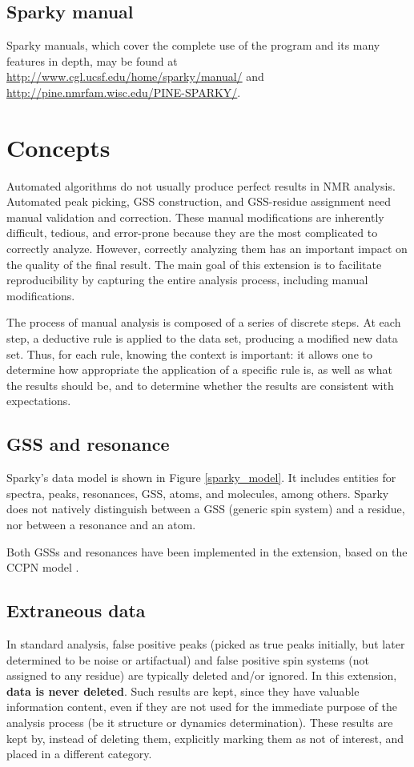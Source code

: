 \subsection*{Sparky manual}
Sparky manuals, which cover the complete use of the program and its many
features in depth, may be found at 
\url{http://www.cgl.ucsf.edu/home/sparky/manual/} and 
\url{http://pine.nmrfam.wisc.edu/PINE-SPARKY/}.


\section{Concepts}
Automated algorithms do not usually produce perfect results in NMR analysis.
Automated peak picking,
GSS construction, and GSS-residue assignment need manual validation and
correction.  These manual modifications are inherently difficult, tedious,
and error-prone because they are the most complicated to correctly analyze.
However, correctly analyzing them has an important impact on the quality
of the final result.
The main goal of this extension is to facilitate reproducibility
by capturing the entire analysis process, including manual modifications.

The process of manual analysis is composed of a series of discrete steps.
At each step, a deductive rule is applied to the data set, producing a
modified new data set.  Thus, for each rule, knowing the context is important:
it allows one to determine how appropriate the application of a specific rule
is, as well as what the results should be, and to determine whether the 
results are consistent with expectations.

\subsection*{GSS and resonance}
Sparky's data model is shown in Figure \ref{sparky_model}.  It includes 
entities for spectra, peaks, resonances, GSS, atoms, and molecules, among
others.  Sparky does not natively distinguish between a GSS (generic spin 
system) and a residue, nor between a resonance and an atom.

Both GSSs and resonances have been implemented in the extension, based 
on the CCPN model \cite{ccpn}.

\subsection*{Extraneous data}
In standard analysis, false positive peaks (picked as true peaks initially,
but later determined to be noise or artifactual) and false positive spin 
systems (not assigned to any residue) are typically deleted and/or ignored.
In this extension, \textbf{data is never deleted}.  Such results are kept,
since they have valuable information content, even if they are not used for
the immediate purpose of the analysis process (be it structure or dynamics
determination).  These results are kept by, instead of deleting them, 
explicitly marking them as not of interest, and placed in a different
category.

